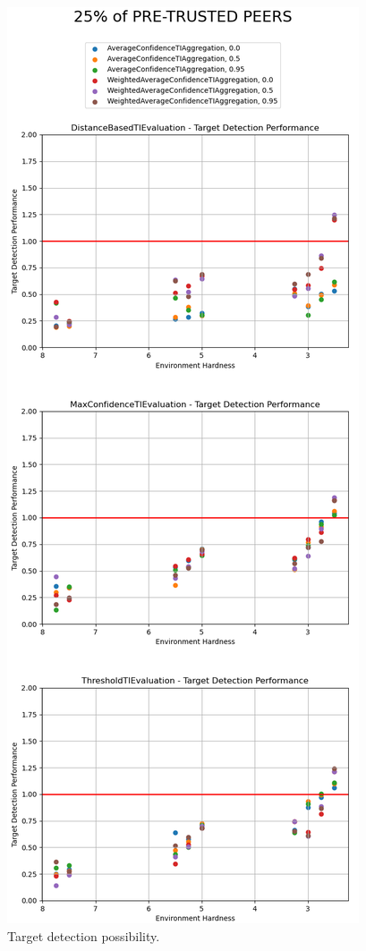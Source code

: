 \label{subsubsec:target-detection-performance}
\begin{figure}[hp]
    \centering
    \includegraphics[height=0.95\textheight]{assets/25_target_detection.png}
    \caption{Target detection possibility.}
    \label{fig:25-target-detection}
\end{figure}

